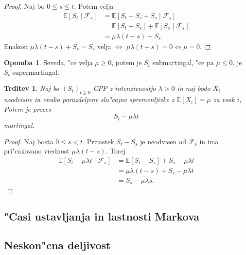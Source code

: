 \documentclass[12pt, a4paper, reqno]{amsart}
\theoremstyle{definition}
\newtheorem{opomba}[definicija]{Opomba}
\theoremstyle{plain}
\newtheorem{trditev}[definicija]{Trditev}
\newcommand{\E}{\mathbb{E}}
\newcommand{\F}{\mathcal{F}}
\newcommand{\1}{\mathds{1}}
\begin{document}
        \begin{proof}
            Naj bo $0\leq s\leq t$. Potem velja
            \begin{align*}
                \E\left[S_t\mid\F_s\right] 
                        &= \E\left[S_t - S_s + S_s\mid \F_s\right] \\
                        &= \E\left[S_t - S_s\right] + \E\left[S_s\mid \F_s\right] \\
                        &= \mu\lambda(t-s) + S_s
            \end{align*}
           Enakost $\mu\lambda(t-s) + S_s = S_s$ velja $\iff$ $\mu\lambda(t-s) = 0 \iff \mu = 0$.
        \end{proof}

        \begin{opomba}
            Seveda, "ce velja $\mu \geq 0$, potem je $S_t$ submartingal, "ce pa $\mu \leq 0$, je
            $S_t$ supermartingal.
        \end{opomba}

        \begin{trditev}
            Naj bo $(S_t)_{t\geq0}$ CPP z intenzivnostjo $\lambda > 0$ in naj bodo $X_i$ neodvisne
            in enako porazdeljene slu"cajne spremenljivke z $\E\left[X_i\right] = \mu$ za vsak $i$,
            Potem je proces 
            $$
                S_t - \mu\lambda t
            $$
            martingal.
            \label{trd:CPPpostanemartingal}
        \end{trditev}

        \begin{proof}
            Naj bosta $0 \leq s < t$. Prirastek $S_t - S_s$ je neodvisen od $\F_s$ in ima 
            pri"cakovano vrednost $\mu\lambda(t-s)$. Torej 
            \begin{align*}
                \E\left[S_t - \mu\lambda t\mid\F_s\right] 
                        &= \E\left[S_t - S_s\right] + S_s - \mu\lambda t\\
                        &= \mu\lambda(t-s) + S_s - \mu\lambda t\\
                        &= S_s - \mu\lambda s.
            \end{align*}
        \end{proof}

    \subsection{"Casi ustavljanja in lastnosti Markova}
    \subsection{Neskon"cna deljivost}
\end{document}
